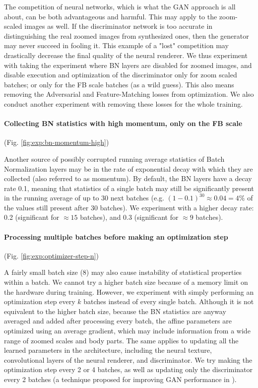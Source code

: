 The competition of neural networks, which is what the GAN approach is all about, can be both advantageous and harmful. This may apply to the zoom-scaled images as well. If the discriminator network is too accurate in distinguishing the real zoomed images from synthesized ones, then the generator may never succeed in fooling it. This example of a "lost" competition may drastically decrease the final quality of the neural renderer. We thus experiment with taking the experiment where BN layers are disabled for zoomed images, and disable execution and optimization of the discriminator only for zoom scaled batches; or only for the FB scale batches (as a wild guess). This also means removing the Adversarial and Feature-Matching losses from optimization. We also conduct another experiment with removing these losses for the whole training.

\vspace{-15pt}\paragraph{Collecting BN statistics with high momentum, only on the FB scale}(Fig. \ref{fig:exp:bn-momentum-high})\mbox{}\nopagebreak

Another source of possibly corrupted running average statistics of Batch Normalization layers may be in the rate of exponential decay with which they are collected (also referred to as momentum). By default, the BN layers have a decay rate 0.1, meaning that statistics of a single batch may still be significantly present in the running average of up to 30 next batches (e.g. $(1-0.1)^{30} \approx 0.04 = 4\%$ of the values still present after 30 batches). We experiment with a higher decay rate: 0.2 (significant for $\approx 15$ batches), and 0.3 (significant for $\approx 9$ batches).

\vspace{-15pt}\paragraph{Processing multiple batches before making an optimization step}(Fig. \ref{fig:exp:optimizer-step-n})\mbox{}\nopagebreak

A fairly small batch size (8) may also cause instability of statistical properties within a batch. We cannot try a higher batch size because of a memory limit on the hardware during training. However, we experiment with simply performing an optimization step every $k$ batches instead of every single batch. Although it is not equivalent to the higher batch size, because the BN statistics are anyway averaged and added after processing every batch, the affine parameters are optimized using an average gradient, which may include information from a wide range of zoomed scales and body parts. The same applies to updating all the learned parameters in the architecture, including the neural texture, convolutional layers of the neural renderer, and discriminator. We try making the optimization step every 2 or 4 batches, as well as updating only the discriminator every 2 batches (a technique proposed for improving GAN performance in \cite{dnn:gan14}).

